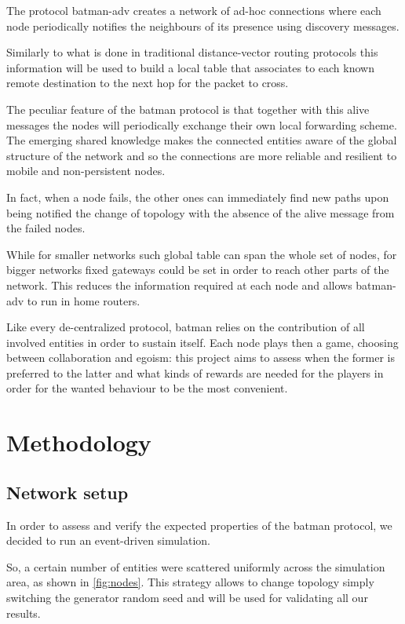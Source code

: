 \documentclass[conference]{IEEEtran}
\begin{document}
\smallskip

The protocol \gls{batman}-adv creates a network of ad-hoc connections where each
node periodically notifies the neighbours of its presence using discovery
messages.

Similarly to what is done in traditional distance-vector routing protocols this
information will be used to build a local table that associates to each known
remote destination to the next hop for the packet to cross.

The peculiar feature of the \gls{batman} protocol is that together with this
alive messages the nodes will periodically exchange their own local forwarding
scheme. The emerging shared knowledge makes the connected entities aware of the
global structure of the network and so the connections are more reliable and
resilient to mobile and non-persistent nodes.

In fact, when a node fails, the other ones can immediately find new paths upon being notified the change of topology with the absence of the alive message from the failed nodes.

While for smaller networks such global table can span the whole set of nodes,
for bigger networks fixed gateways could be set in order to reach other parts of
the network. This reduces the information required at each node and allows
\gls{batman}-adv to run in home routers.

\smallskip

Like every de-centralized protocol, \gls{batman} relies on the contribution of
all involved entities in order to sustain itself. Each node plays then a game,
choosing between collaboration and egoism: this project aims to assess when the
former is preferred to the latter and what kinds of rewards are needed for the
players in order for the wanted behaviour to be the most convenient.

\section{Methodology}

\subsection{Network setup}

In order to assess and verify the expected properties of the \gls{batman}
protocol, we decided to run an event-driven simulation.

So, a certain number of entities were scattered uniformly across the simulation
area, as shown in \autoref{fig:nodes}. This strategy allows to change topology
simply switching the generator random seed and will be used for validating all our results.
\end{document}
